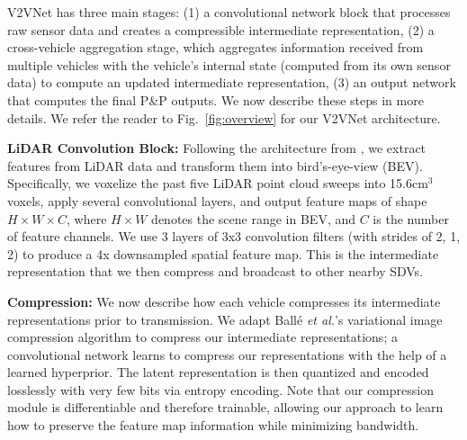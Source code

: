 \documentclass[runningheads]{llncs}
\newcommand{\pnp}{P\&P}
\newcommand{\figref}{Fig.~\ref}
\newcommand{\etal}{\textit{et al.}}
\begin{document}
 V2VNet  has three main stages:
(1) a convolutional network block
 that processes raw sensor 
data and creates a compressible intermediate representation,
(2) a cross-vehicle aggregation stage, which aggregates information received from multiple vehicles with the vehicle's internal state (computed from its own sensor data) to compute an updated intermediate representation,
(3) an output network that computes the final
\pnp{}
outputs.
We now describe these steps in more details.
We refer the reader to \figref{fig:overview} for our 
V2VNet 
architecture.

{\flushleft\bf LiDAR Convolution Block:}
\label{sec:preprocess}
Following the architecture from \cite{yang2018pixor}, we  extract 
features from 
LiDAR data
and transform them into bird's-eye-view (BEV).
Specifically, we voxelize the past five LiDAR point cloud sweeps into
15.6cm$^3$ voxels, apply several convolutional layers, and output feature maps of shape $H\times W\times C$, where $H\times W$ denotes the scene range in BEV, and $C$ is the number of feature channels.
We use 3 layers of 3x3 convolution filters (with strides of 2, 1, 2) to produce a 4x downsampled spatial feature map.
This is the intermediate representation that we 
then compress and broadcast to other nearby SDVs. 

{\flushleft\bf Compression:}
We now describe how each vehicle compresses its intermediate representations prior to transmission.
We adapt
Ball\'e  \etal's variational image compression algorithm \cite{balle2018variational} to compress our intermediate representations; 
a convolutional network learns
to compress our representations with the help of a learned hyperprior. The latent representation is then quantized and 
encoded losslessly with very few bits via entropy encoding.
Note that our compression module is differentiable and therefore trainable, allowing our approach to learn how to preserve the feature map information while minimizing bandwidth.
\end{document}
